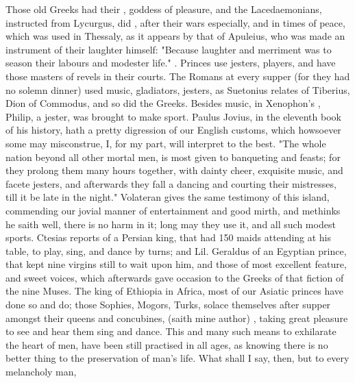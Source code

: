 {Those old Greeks had their , goddess of pleasure, and the Lacedaemonians, instructed from Lycurgus, did , after their wars especially, and in times of peace, which was used in Thessaly, as it appears by that of Apuleius, who was made an instrument of their laughter himself: "Because laughter and merriment was to season their labours and modester life." . Princes use jesters, players, and have those masters of revels in their courts. The Romans at every supper (for they had no solemn dinner) used music, gladiators, jesters, \etc{} as Suetonius relates of Tiberius, Dion of Commodus, and so did the Greeks. Besides music, in Xenophon's  , Philip, a jester, was brought to make sport. Paulus Jovius, in the eleventh book of his history, hath a pretty digression of our English customs, which howsoever some may misconstrue, I, for my part, will interpret to the best. "The whole nation beyond all other mortal men, is most given to banqueting and feasts; for they prolong them many hours together, with dainty cheer, exquisite music, and facete jesters, and afterwards they fall a dancing and courting their mistresses, till it be late in the night." Volateran gives the same testimony of this island, commending our jovial manner of entertainment and good mirth, and methinks he saith well, there is no harm in it; long may they use it, and all such modest sports. Ctesias reports of a Persian king, that had 150 maids attending at his table, to play, sing, and dance by turns; and Lil. Geraldus of an Egyptian prince, that kept nine virgins still to wait upon him, and those of most excellent feature, and sweet voices, which afterwards gave occasion to the Greeks of that fiction of the nine Muses. The king of Ethiopia in Africa, most of our Asiatic princes have done so and do; those Sophies, Mogors, Turks, \etc{} solace themselves after supper amongst their queens and concubines,  (saith mine author) , taking great pleasure to see and hear them sing and dance. This and many such means to exhilarate the heart of men, have been still practised in all ages, as knowing there is no better thing to the preservation of man's life. What shall I say, then, but to every melancholy man,

}
